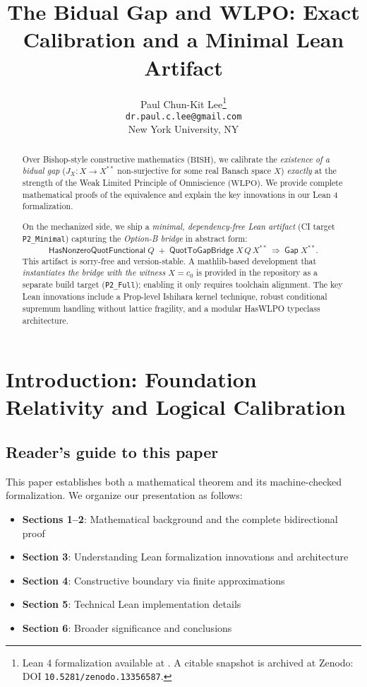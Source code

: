 \documentclass[11pt]{article}  %
\title{The Bidual Gap and WLPO: Exact Calibration and a Minimal Lean Artifact}
\author{Paul Chun-Kit Lee\thanks{Lean 4 formalization available at \leanRepo. A citable snapshot is archived at Zenodo: DOI \texttt{10.5281/zenodo.13356587}.} \\ 
\texttt{dr.paul.c.lee@gmail.com} \\
New York University, NY}
\date{}
\newcommand{\WLPO}{\mathrm{WLPO}}
\newcommand{\BISH}{\mathrm{BISH}}
\begin{document}
\begin{abstract}
Over Bishop-style constructive mathematics ($\BISH$), we calibrate the \emph{existence of a bidual gap}
($J_X:X\to X^{**}$ non-surjective for some real Banach space $X$) \emph{exactly} at the strength of
the Weak Limited Principle of Omniscience ($\WLPO$). We provide complete mathematical proofs of the equivalence 
and explain the key innovations in our Lean 4 formalization.

On the mechanized side, we ship a \emph{minimal, dependency-free Lean artifact} (CI target \texttt{P2\_Minimal})
capturing the \emph{Option-B bridge} in abstract form:
\[
\textsf{HasNonzeroQuotFunctional}\;Q \;+\; \textsf{QuotToGapBridge}\;X\,Q\,X^{**}\ \Longrightarrow\ \textsf{Gap}\;X^{**}.
\]
This artifact is sorry-free and version-stable. A mathlib-based development that \emph{instantiates the bridge with the witness $X=c_0$} is provided in the repository as a separate build target (\texttt{P2\_Full}); enabling it only requires toolchain alignment. The key Lean innovations include a Prop-level Ishihara kernel technique, robust conditional supremum handling without lattice fragility, and a modular HasWLPO typeclass architecture.
\end{abstract}

\maketitle

\tableofcontents

\section{Introduction: Foundation Relativity and Logical Calibration}

\subsection{Reader's guide to this paper}

This paper establishes both a mathematical theorem and its machine-checked formalization. We organize our presentation as follows:

\begin{itemize}
\item \textbf{Sections 1--2}: Mathematical background and the complete bidirectional proof
\item \textbf{Section 3}: Understanding Lean formalization innovations and architecture  
\item \textbf{Section 4}: Constructive boundary via finite approximations
\item \textbf{Section 5}: Technical Lean implementation details
\item \textbf{Section 6}: Broader significance and conclusions
\end{itemize}
\end{document}
